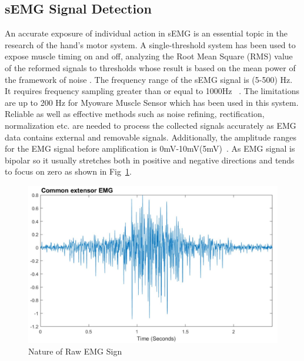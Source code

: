 \documentclass[conference]{IEEEtran}
\begin{document}
\subsection{sEMG Signal Detection}
An accurate exposure of individual action in sEMG is an essential topic in the research of the hand’s motor system. A single-threshold system has been used to expose muscle timing on and off, analyzing the Root Mean Square (RMS) value of the reformed signals to thresholds whose result is based on the mean power of the framework of noise \cite{7428468}. The frequency range of the sEMG signal is (5-500) Hz. It requires frequency sampling greater than or equal to 1000Hz ~\cite{articlegfgf}. The limitations are up to  200  Hz  for  Myoware  Muscle  Sensor which has been used in this system. Reliable as well as effective methods such as noise refining, rectification, normalization etc. are needed to  process  the  collected  signals  accurately as  EMG data contains external and removable signals. Additionally, the amplitude ranges for the EMG signal before amplification is 0mV-10mV(5mV)~\cite{5234929}. As EMG signal is bipolar so it usually stretches both in positive and negative directions and tends to focus on zero as shown in Fig~\ref{fig:7}.
\begin{figure}[htbp]
 \centerline{\includegraphics[scale=0.31]{fig7.JPG}}
 \caption{Nature of Raw EMG Sign}
  \label{fig:7}
\end{figure}\\
\end{document}
